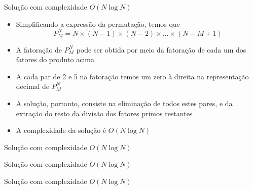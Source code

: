 \begin{frame}[fragile]{Solução com complexidade $O(N\log N)$}

    \begin{itemize}
        \item Simplificando a expressão da permutação, temos que
        $$
            P_M^N = N \times (N - 1)\times (N - 2)\times \ldots \times (N - M + 1)
        $$

        \item A fatoração de $P_M^N$ pode ser obtida por meio da fatoração de cada um dos
            fatores do produto acima

        \item A cada par de 2 e 5 na fatoração temos um zero à direita na representação decimal
            de $P_M^N$

        \item A solução, portanto, consiste na eliminação de todos estes pares, e da extração
            do resto da divisão dos fatores primos restantes

        \item A complexidade da solução é $O(N\log N)$

    \end{itemize}

\end{frame}

\begin{frame}[fragile]{Solução com complexidade $O(N\log N)$}
\end{frame}

\begin{frame}[fragile]{Solução com complexidade $O(N\log N)$}
\end{frame}

\begin{frame}[fragile]{Solução com complexidade $O(N\log N)$}
\end{frame}
